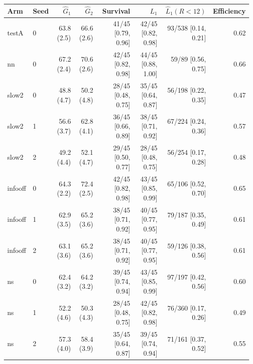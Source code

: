 \begin{tabular}{llrrrrrr}
\toprule
Arm & Seed & $\hat G_1$ & $\hat G_2$ & Survival & $\hat L_1$ & $\hat L_1(R<12)$ & Efficiency \\
\midrule
testA & 0 & 63.8 (2.5) & 66.6 (2.6) & 41/45 [0.79, 0.96] & 42/45 [0.82, 0.98] & 93/538 [0.14, 0.21] & 0.62 \\
nn & 0 & 67.2 (2.4) & 70.6 (2.6) & 42/45 [0.82, 0.98] & 44/45 [0.88, 1.00] & 59/89 [0.56, 0.75] & 0.66 \\
slow2 & 0 & 48.8 (4.7) & 50.2 (4.8) & 28/45 [0.48, 0.75] & 35/45 [0.64, 0.87] & 56/198 [0.22, 0.35] & 0.47 \\
slow2 & 1 & 56.6 (3.7) & 62.8 (4.1) & 36/45 [0.66, 0.89] & 38/45 [0.71, 0.92] & 67/224 [0.24, 0.36] & 0.57 \\
slow2 & 2 & 49.2 (4.4) & 52.1 (4.7) & 29/45 [0.50, 0.77] & 28/45 [0.48, 0.75] & 56/254 [0.17, 0.28] & 0.48 \\
infooff & 0 & 64.3 (2.2) & 72.4 (2.5) & 42/45 [0.82, 0.98] & 43/45 [0.85, 0.99] & 65/106 [0.52, 0.70] & 0.65 \\
infooff & 1 & 62.9 (3.5) & 65.2 (3.6) & 38/45 [0.71, 0.92] & 40/45 [0.77, 0.95] & 79/187 [0.35, 0.49] & 0.61 \\
infooff & 2 & 63.1 (3.6) & 65.2 (3.6) & 38/45 [0.71, 0.92] & 40/45 [0.77, 0.95] & 59/126 [0.38, 0.56] & 0.61 \\
ns & 0 & 62.4 (3.2) & 64.2 (3.2) & 39/45 [0.74, 0.94] & 43/45 [0.85, 0.99] & 97/197 [0.42, 0.56] & 0.60 \\
ns & 1 & 52.2 (4.6) & 50.3 (4.3) & 28/45 [0.48, 0.75] & 42/45 [0.82, 0.98] & 76/360 [0.17, 0.26] & 0.49 \\
ns & 2 & 57.3 (4.0) & 58.4 (3.9) & 35/45 [0.64, 0.87] & 39/45 [0.74, 0.94] & 71/161 [0.37, 0.52] & 0.55 \\
\bottomrule
\end{tabular}
